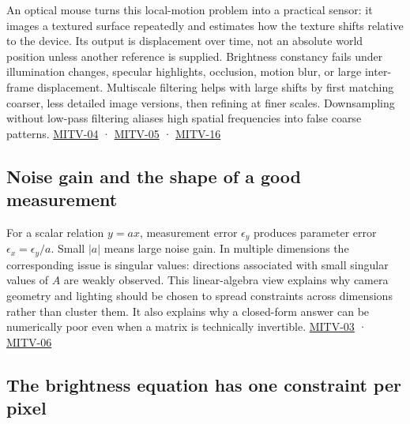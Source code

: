 An optical mouse turns this local-motion problem into a practical sensor: it images a textured surface repeatedly and estimates how the texture shifts relative to the device. Its output is displacement over time, not an absolute world position unless another reference is supplied. Brightness constancy fails under illumination changes, specular highlights, occlusion, motion blur, or large inter-frame displacement. Multiscale filtering helps with large shifts by first matching coarser, less detailed image versions, then refining at finer scales. Downsampling without low-pass filtering aliases high spatial frequencies into false coarse patterns. \hyperref[04-visual-computing-ii-ch036-mitv-04---fixed-optical-flow-optical-mouse-constant-brightness-assumption-closed-form-solution]{MITV-04} · \hyperref[04-visual-computing-ii-ch036-mitv-05---tcc-and-for-montivision-demos-vanishing-point-use-of-vps-in-camera-calibration]{MITV-05} · \hyperref[04-visual-computing-ii-ch036-mitv-16---fast-convolution-low-pass-filter-approximations-integral-images-us-6457032]{MITV-16}

\subsection{Noise gain and the shape of a good measurement}\label{04-visual-computing-ii-ch030-noise-gain-and-the-shape-of-a-good-measurement}

For a scalar relation \(y=ax\), measurement error \(\epsilon_y\) produces parameter error \(\epsilon_x=\epsilon_y/a\). Small \(|a|\) means large noise gain. In multiple dimensions the corresponding issue is singular values: directions associated with small singular values of \(A\) are weakly observed. This linear-algebra view explains why camera geometry and lighting should be chosen to spread constraints across dimensions rather than cluster them. It also explains why a closed-form answer can be numerically poor even when a matrix is technically invertible. \hyperref[04-visual-computing-ii-ch036-mitv-03---time-to-contact-focus-of-expansion-direct-motion-vision-methods-noise-gain]{MITV-03} · \hyperref[04-visual-computing-ii-ch036-mitv-06---photometric-stereo-noise-gain-error-amplification-eigenvalues-and-eigenvectors-review]{MITV-06}

\subsection{The brightness equation has one constraint per pixel}\label{04-visual-computing-ii-ch030-the-brightness-equation-has-one-constraint-per-pixel}

